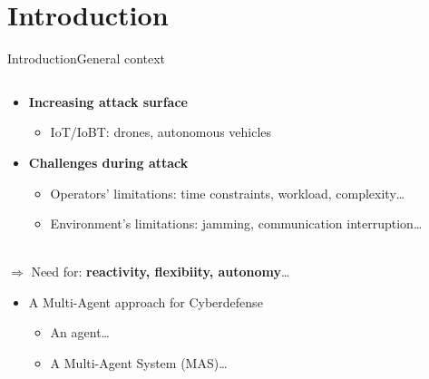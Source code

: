 

\addtocounter{framenumber}{-2}

\section{Introduction}

\begin{frame}{Introduction}{General context}

    \begin{columns}

        \begin{column}{0.7\textwidth}

            \begin{itemize}
                \item \textbf{Increasing attack surface}
                      \begin{itemize}
                          \item IoT/IoBT: drones, autonomous vehicles
                      \end{itemize}
                \item \textbf{Challenges during attack}
                      \begin{itemize}
                          \item Operators' limitations: time constraints, workload, complexity\dots
                          \item Environment's limitations: jamming, communication interruption\dots
                      \end{itemize}
            \end{itemize}

            \ \\

            $\Longrightarrow$ Need for: \textbf{reactivity, flexibiity, autonomy}\dots

            \begin{itemize}
                \item A Multi-Agent approach for Cyberdefense
                      \begin{itemize}
                          \item An agent\dots
                          \item A Multi-Agent System (MAS)\dots
                      \end{itemize}
            \end{itemize}


\end{column}
\end{columns}
\end{frame}
